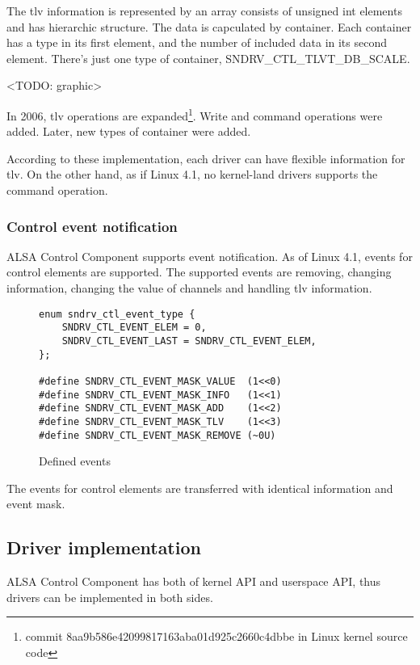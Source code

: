 \documentclass[onecolumn]{article}
\begin{document}
The tlv information is represented by an array consists of unsigned int elements and  has hierarchic structure. The data is capculated by container. Each container has a type in its first element, and the number of included data in its second element. There's just one type of container, SNDRV\_CTL\_TLVT\_DB\_SCALE.

<TODO: graphic>

In 2006, tlv operations are expanded\footnote{commit 8aa9b586e42099817163aba01d925c2660c4dbbe in Linux kernel source code}. Write and command operations were added. Later, new types of container were added.

According to these implementation, each driver can have flexible information for tlv. On the other hand, as if Linux 4.1, no kernel-land drivers supports the command operation.


\subsubsection{Control event notification}

ALSA Control Component supports event notification. As of Linux 4.1, events for control elements are supported. The supported events are removing, changing information, changing the value of channels and handling tlv information.

\begin{figure}[htbp]
\small
\begin{verbatim}
enum sndrv_ctl_event_type {
    SNDRV_CTL_EVENT_ELEM = 0,
    SNDRV_CTL_EVENT_LAST = SNDRV_CTL_EVENT_ELEM,
};

#define SNDRV_CTL_EVENT_MASK_VALUE  (1<<0)
#define SNDRV_CTL_EVENT_MASK_INFO   (1<<1)
#define SNDRV_CTL_EVENT_MASK_ADD    (1<<2)
#define SNDRV_CTL_EVENT_MASK_TLV    (1<<3)
#define SNDRV_CTL_EVENT_MASK_REMOVE (~0U)
\end{verbatim}
\caption{{Defined events}}
\label{defined-events}
\end{figure}

The events for control elements are transferred with identical information and event mask.

\subsection{Driver implementation}

ALSA Control Component has both of kernel API and userspace API, thus drivers can be implemented in both sides.
\end{document}
